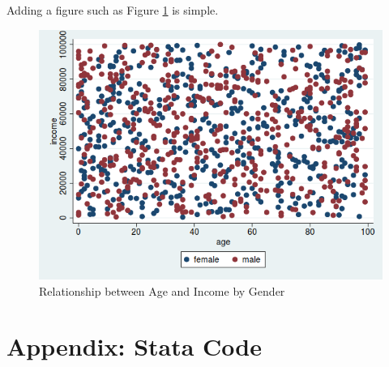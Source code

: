\documentclass[11pt, oneside]{article}   	%
\begin{document}
Adding a figure such as Figure \ref{fig:scatter} is simple. 

\begin{figure}[htp]
    \centering
    \includegraphics[scale=0.5]{test.png}
    \caption{Relationship between Age and Income by Gender}
    \label{fig:scatter}
\end{figure}



\newpage

\appendix

\section*{Appendix: Stata Code}

\end{document}
